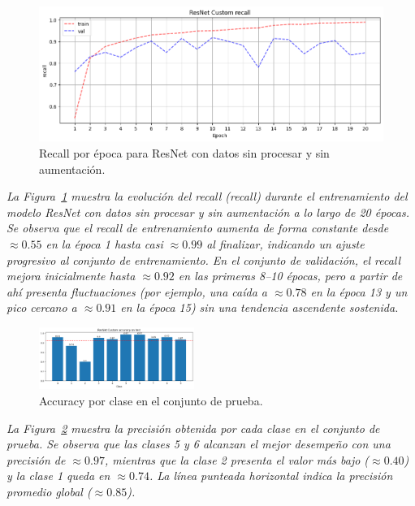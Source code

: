 \documentclass[conference]{IEEEtran}
\begin{document}
\begin{figure}[H]
    \centering
    \includegraphics[width=0.95\linewidth]{graphics-resnet-raw/resnet_raw_without_recall.png}
    \caption{Recall por época para ResNet con datos sin procesar y sin aumentación.}
    \label{fig:resnet_raw_without_recall}
\end{figure}
\noindent\textit{%
La Figura~\ref{fig:resnet_raw_without_recall} muestra la evolución del recall (recall) durante el entrenamiento del modelo ResNet con datos sin procesar y sin aumentación a lo largo de 20 épocas. Se observa que el recall de entrenamiento aumenta de forma constante desde \(\approx0.55\) en la época 1 hasta casi \(\approx0.99\) al finalizar, indicando un ajuste progresivo al conjunto de entrenamiento. En el conjunto de validación, el recall mejora inicialmente hasta \(\approx0.92\) en las primeras 8–10 épocas, pero a partir de ahí presenta fluctuaciones (por ejemplo, una caída a \(\approx0.78\) en la época 13 y un pico cercano a \(\approx0.91\) en la época 15) sin una tendencia ascendente sostenida.
}

\begin{figure}[H]
    \centering
    \includegraphics[width=0.45\textwidth]{graphics-resnet-raw/resnet_raw_without_class_accuracy.png}
    \caption{Accuracy por clase en el conjunto de prueba.}
    \label{fig:resnet_raw_without_class_accuracy}
\end{figure}
\noindent\textit{%
La Figura~\ref{fig:resnet_raw_without_class_accuracy} muestra la precisión obtenida por cada clase en el conjunto de prueba. Se observa que las clases 5 y 6 alcanzan el mejor desempeño con una precisión de \(\approx0.97\), mientras que la clase 2 presenta el valor más bajo (\(\approx0.40\)) y la clase 1 queda en \(\approx0.74\). La línea punteada horizontal indica la precisión promedio global (\(\approx0.85\)). 
}
\end{document}
